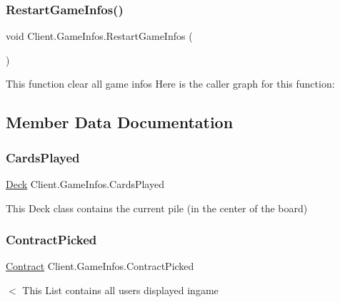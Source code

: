 \subsubsection{\texorpdfstring{Restart\+Game\+Infos()}{RestartGameInfos()}}
{\footnotesize\ttfamily void Client.\+Game\+Infos.\+Restart\+Game\+Infos (\begin{DoxyParamCaption}{ }\end{DoxyParamCaption})\hspace{0.3cm}{\ttfamily [inline]}}

This function clear all game infos Here is the caller graph for this function\+:


\subsection{Member Data Documentation}
\mbox{\label{class_client_1_1_game_infos_a00af5f50e9e390863429f7d92f6773f6}} 
\subsubsection{\texorpdfstring{Cards\+Played}{CardsPlayed}}
{\footnotesize\ttfamily \hyperlink{class_game_1_1_deck}{Deck} Client.\+Game\+Infos.\+Cards\+Played}

This Deck class contains the current pile (in the center of the board) \mbox{\label{class_client_1_1_game_infos_a2a529958f54314f5cda3688858bf3f26}} 
\subsubsection{\texorpdfstring{Contract\+Picked}{ContractPicked}}
{\footnotesize\ttfamily \hyperlink{class_game_1_1_contract}{Contract} Client.\+Game\+Infos.\+Contract\+Picked}

$<$ This List contains all users displayed ingame \mbox{\label{class_client_1_1_game_infos_a0575b18e5cac61c7f5c23d1aec491f7f}} 
